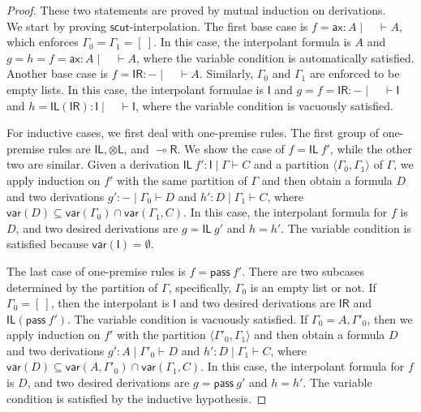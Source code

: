 \documentclass[sn-mathphys-num]{sn-jnl}%
\newcommand{\GG}{\Gamma}
\newcommand{\vd}{\vdash}
\newcommand{\tl}{\otimes \mathsf{L}}
\newcommand{\pass}{\mathsf{pass}}
\newcommand{\unitl}{\mathsf{IL}}
\newcommand{\unitr}{\mathsf{IR}}
\newcommand{\ax}{\mathsf{ax}}
\newcommand{\lolli}{\multimap}
\newcommand{\lright}{{\lolli}\mathsf{R}}
\newcommand{\I}{\mathsf{I}}
\newcommand{\mf}[1]{\mathsf{#1}}
\newcommand{\vars}[1]{\mathsf{var}(#1)}
\theoremstyle{thmstyleone}%
\theoremstyle{thmstyletwo}%
\theoremstyle{thmstylethree}%
\begin{document}
\begin{proof}
  These two statements are proved by mutual induction on derivations.
\\
We start by proving $\mf{scut}$-interpolation.
The first base case is $f = \ax : A \mid \quad \vd A$, which enforces $\GG_0 = \GG_1 = [\ ]$.
In this case, the interpolant formula is $A$ and $g = h = f = \ax : A \mid \quad \vd A$, where the variable condition is automatically satisfied.
Another base case is $f = \unitr : {-} \mid \quad \vd A$.
Similarly, $\GG_0$ and $\GG_1$ are enforced to be empty lists.
In this case, the interpolant formulae is $\I$ and $g = f = \unitr : {-} \mid \quad \vd \I$ and $h = \unitl (\unitr) : \I \mid \quad \vd \I$, where the variable condition is vacuously satisfied.

For inductive cases, we first deal with one-premise rules.
The first group of one-premise rules are $\unitl, \tl$, and $\lright$.
We show the case of $f = \unitl \ f'$, while the other two are similar.
Given a derivation $\unitl \ f' : \I \mid \GG \vd C$ and a partition $\langle \GG_0, \GG_1 \rangle$ of $\GG$, we apply induction on $f'$ with the same partition of $\GG$ and then obtain a formula $D$ and two derivations $g' : {-} \mid \GG_0 \vd D$ and $h' : D \mid \GG_1 \vd C$, where $\vars{D} \subseteq \vars{\GG_0} \cap \vars{\GG_1, C}$.
In this case, the interpolant formula for $f$ is $D$, and two desired derivations are $g = \unitl \ g'$ and $h = h'$.
The variable condition is satisfied because $\vars{\I} = \emptyset$.

The last case of one-premise rules is $ f = \pass \ f'$.
There are two subcases determined by the partition of $\GG$, specifically, $\GG_0$ is an empty list or not. 
If $\GG_0 = [\ ]$, then the interpolant is $\I$ and two desired derivations are $\unitr$ and $\unitl (\pass \ f')$.
The variable condition is vacuously satisfied.
If $\GG_0 = A, \GG'_0$, then we apply induction on $f'$ with the partition $\langle \GG'_0, \GG_1 \rangle$ and then obtain a formula $D$ and two derivations $g' : A \mid \GG'_0 \vd D$ and $h' : D \mid \GG_1 \vd C$, where $\vars{D} \subseteq \vars{A, \GG'_0} \cap \vars{\GG_1, C}$.
In this case, the interpolant formula for $f$ is $D$, and two desired derivations are $g = \pass \ g'$ and $h = h'$.
The variable condition is satisfied by the inductive hypothesis.


\end{proof}
\end{document}
